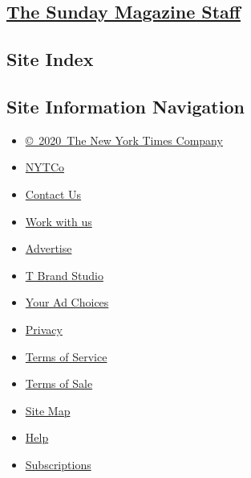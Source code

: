 \subsection{}

\hypertarget{the-sunday-magazine-staff}{%
\subsection{\texorpdfstring{\href{\%0Ahttps://www.nytimes3xbfgragh.onion/interactive/magazine/masthead.html}{The
Sunday Magazine
Staff}}{The Sunday Magazine Staff}}\label{the-sunday-magazine-staff}}

\hypertarget{site-index}{%
\subsection{Site Index}\label{site-index}}

\hypertarget{site-information-navigation}{%
\subsection{Site Information
Navigation}\label{site-information-navigation}}

\begin{itemize}
\tightlist
\item
  \href{https://help.nytimes3xbfgragh.onion/hc/en-us/articles/115014792127-Copyright-notice}{©~2020~The
  New York Times Company}
\end{itemize}

\begin{itemize}
\tightlist
\item
  \href{https://www.nytco.com/}{NYTCo}
\item
  \href{https://help.nytimes3xbfgragh.onion/hc/en-us/articles/115015385887-Contact-Us}{Contact
  Us}
\item
  \href{https://www.nytco.com/careers/}{Work with us}
\item
  \href{https://nytmediakit.com/}{Advertise}
\item
  \href{http://www.tbrandstudio.com/}{T Brand Studio}
\item
  \href{https://www.nytimes3xbfgragh.onion/privacy/cookie-policy\#how-do-i-manage-trackers}{Your
  Ad Choices}
\item
  \href{https://www.nytimes3xbfgragh.onion/privacy}{Privacy}
\item
  \href{https://help.nytimes3xbfgragh.onion/hc/en-us/articles/115014893428-Terms-of-service}{Terms
  of Service}
\item
  \href{https://help.nytimes3xbfgragh.onion/hc/en-us/articles/115014893968-Terms-of-sale}{Terms
  of Sale}
\item
  \href{https://spiderbites.nytimes3xbfgragh.onion}{Site Map}
\item
  \href{https://help.nytimes3xbfgragh.onion/hc/en-us}{Help}
\item
  \href{https://www.nytimes3xbfgragh.onion/subscription?campaignId=37WXW}{Subscriptions}
\end{itemize}
